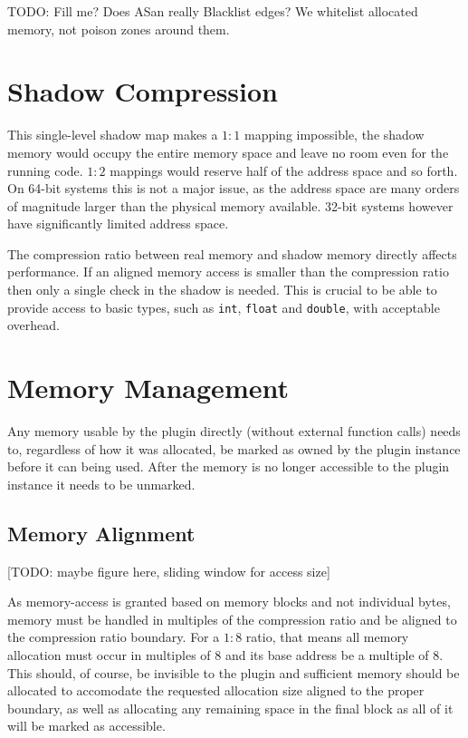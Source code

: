 TODO: Fill me? Does ASan really Blacklist edges? We whitelist allocated memory,
not poison zones around them.


\section {Shadow Compression}

This single-level shadow map makes a $1:1$ mapping impossible, the shadow memory
would occupy the entire memory space and leave no room even for the running
code. $1:2$ mappings would reserve half of the address space and so forth. On
64-bit systems this is not a major issue, as the address space are many orders
of magnitude larger than the physical memory available. 32-bit systems however
have significantly limited address space.

The compression ratio between real memory and shadow memory directly affects
performance. If an aligned memory access is smaller than the compression ratio
then only a single check in the shadow is needed. This is crucial to be able to
provide access to basic types, such as \texttt{int}, \texttt{float} and
\texttt{double}, with acceptable overhead.


\section {Memory Management}

Any memory usable by the plugin directly (without external function calls) needs
to, regardless of how it was allocated, be marked as owned by the plugin
instance before it can being used. After the memory is no longer accessible to
the plugin instance it needs to be unmarked.

\subsection {Memory Alignment}

[TODO: maybe figure here, sliding window for access size]

As memory-access is granted based on memory blocks and not individual bytes,
memory must be handled in multiples of the compression ratio and be aligned to
the compression ratio boundary. For a $1:8$ ratio, that means all memory
allocation must occur in multiples of $8$ and its base address be a multiple of
$8$. This should, of course, be invisible to the plugin and sufficient memory
should be allocated to accomodate the requested allocation size aligned to the
proper boundary, as well as allocating any remaining space in the final block as
all of it will be marked as accessible.

